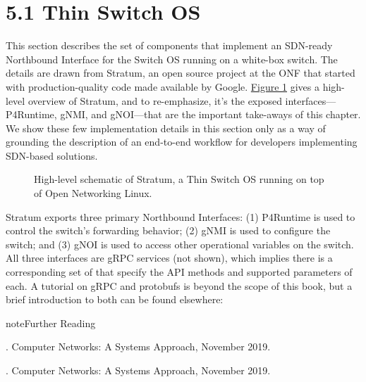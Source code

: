 \documentclass[letterpaper,11pt,english]{sphinxmanual}
\let\sphinxpxdimen\pdfpxdimen\else\newdimen\sphinxpxdimen
\begin{document}
\section{5.1 Thin Switch OS}
\label{\detokenize{stratum:thin-switch-os}}
This section describes the set of components that implement an
SDN-ready Northbound Interface for the Switch OS running on a
white-box switch. The details are drawn from Stratum, an open source
project at the ONF that started with production-quality code made
available by Google. \hyperref[\detokenize{stratum:fig-stratum}]{Figure \ref{\detokenize{stratum:fig-stratum}}} gives a
high-level overview of Stratum, and to re-emphasize, it’s the exposed
interfaces—P4Runtime, gNMI, and gNOI—that are the important take-aways
of this chapter. We show these few implementation details in this
section only as a way of grounding the description of an end-to-end
workflow for developers implementing SDN-based solutions.

\begin{figure}[htbp]
\centering
\capstart

\noindent\sphinxincludegraphics[width=500\sphinxpxdimen]{{Slide17}.png}
\caption{High-level schematic of Stratum, a Thin Switch OS running on top
of Open Networking Linux.}\label{\detokenize{stratum:id3}}\label{\detokenize{stratum:fig-stratum}}\end{figure}

Stratum exports three primary Northbound Interfaces: (1) P4Runtime is
used to control the switch’s forwarding behavior; (2) gNMI is used to
configure the switch; and (3) gNOI is used to access other operational
variables on the switch. All three interfaces are gRPC services (not
shown), which implies there is a corresponding set of  that specify the API methods and supported
parameters of each. A tutorial on gRPC and protobufs is beyond the
scope of this book, but a brief introduction to both can be found
elsewhere:

\label{\detokenize{stratum:reading-grpc}}
\begin{sphinxadmonition}{note}{Further Reading}

.
Computer Networks: A Systems Approach, November 2019.

.
Computer Networks: A Systems Approach, November 2019.
\end{sphinxadmonition}
\end{document}
